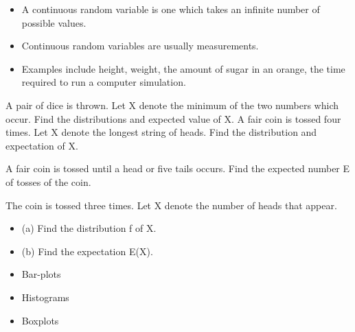 \documentclass[12pt]{report}
\begin{document}
{ \Large
	\begin{itemize} \item
		A continuous random variable is one which takes an infinite number of possible values. \item Continuous random variables are usually measurements. \item Examples include height, weight, the amount of sugar in an orange, the time required to run a computer simulation. \end{itemize}
	
}
	
	
	A pair of dice is thrown. Let X denote the minimum of the two numbers which occur.
	Find the distributions and expected value of X.
		A fair coin is tossed four times.
	Let X denote the longest string of heads.
	Find the distribution and expectation of X.

A fair coin is tossed until a head or five tails occurs.
	Find the expected number E of tosses of the coin.
	
	The coin is tossed three times. Let X denote the number of
	heads that appear.
	\begin{itemize}
		\item (a) Find the distribution f of X.
		\item (b) Find the expectation E(X).
	\end{itemize}
	
	\begin{itemize}
		\item Bar-plots
		\item Histograms
		\item Boxplots
		
	\end{itemize}
	
\end{document}
